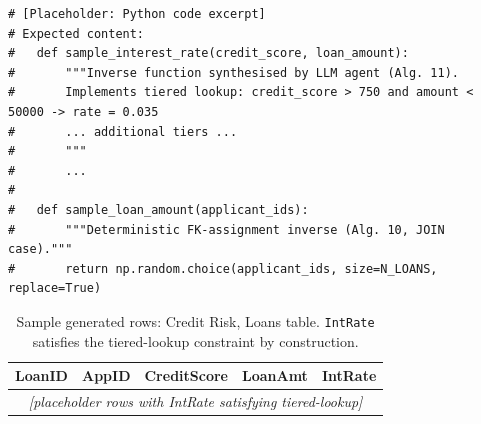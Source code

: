 \begin{lstlisting}[caption={[Placeholder] Python code excerpt generated by ScribbleDB
  for the Credit Risk database. The \texttt{sample\_interest\_rate} function implements
  the LLM-synthesised inverse for the tiered-lookup constraint.},
  label={lst:codegen}]
# [Placeholder: Python code excerpt]
# Expected content:
#   def sample_interest_rate(credit_score, loan_amount):
#       """Inverse function synthesised by LLM agent (Alg. 11).
#       Implements tiered lookup: credit_score > 750 and amount < 50000 -> rate = 0.035
#       ... additional tiers ...
#       """
#       ...
#
#   def sample_loan_amount(applicant_ids):
#       """Deterministic FK-assignment inverse (Alg. 10, JOIN case)."""
#       return np.random.choice(applicant_ids, size=N_LOANS, replace=True)
\end{lstlisting}

\begin{table}[t]
  \caption{Sample generated rows: Credit Risk, Loans table.
           \texttt{IntRate} satisfies the tiered-lookup constraint by construction.}
  \label{tab:case-study}
  \centering
  \small
  \begin{tabular}{ccccc}
    \toprule
    LoanID & AppID & CreditScore & LoanAmt & IntRate \\
    \midrule
    \multicolumn{5}{c}{\textit{[placeholder rows with IntRate satisfying tiered-lookup]}} \\
    \bottomrule
  \end{tabular}
\end{table}


